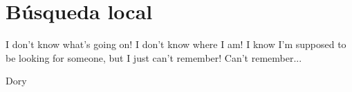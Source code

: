 \chapter{B\'usqueda local}
\label{busqueda}
\epigraph{I don't know what's going on! I don't know where I am! I know I'm
supposed to be looking for someone, but I just can't remember! Can't
remember...}%
{Dory}
